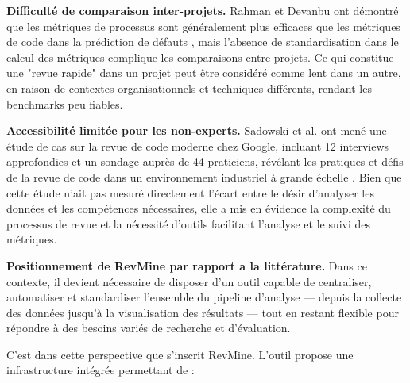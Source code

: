 \textbf{Difficulté de comparaison inter-projets.} Rahman et Devanbu ont démontré que les métriques de processus sont généralement plus efficaces que les métriques de code dans la prédiction de défauts \cite{rahman2013process}, mais l'absence de standardisation dans le calcul des métriques complique les comparaisons entre projets. Ce qui constitue une "revue rapide" dans un projet peut être considéré comme lent dans un autre, en raison de contextes organisationnels et techniques différents, rendant les benchmarks peu fiables.

\textbf{Accessibilité limitée pour les non-experts.} Sadowski et al. ont mené une étude de cas sur la revue de code moderne chez Google, incluant 12 interviews approfondies et un sondage auprès de 44 praticiens, révélant les pratiques et défis de la revue de code dans un environnement industriel à grande échelle \cite{sadowski2018modern}. Bien que cette étude n'ait pas mesuré directement l'écart entre le désir d'analyser les données et les compétences nécessaires, elle a mis en évidence la complexité du processus de revue et la nécessité d'outils facilitant l'analyse et le suivi des métriques.

\textbf{Positionnement de RevMine par rapport a la littérature.} Dans ce contexte, il devient nécessaire de disposer d'un outil capable de centraliser, automatiser et standardiser l'ensemble du pipeline d'analyse — depuis la collecte des données jusqu'à la visualisation des résultats — tout en restant flexible pour répondre à des besoins variés de recherche et d'évaluation.

C'est dans cette perspective que s'inscrit RevMine. L'outil propose une infrastructure intégrée permettant de :

